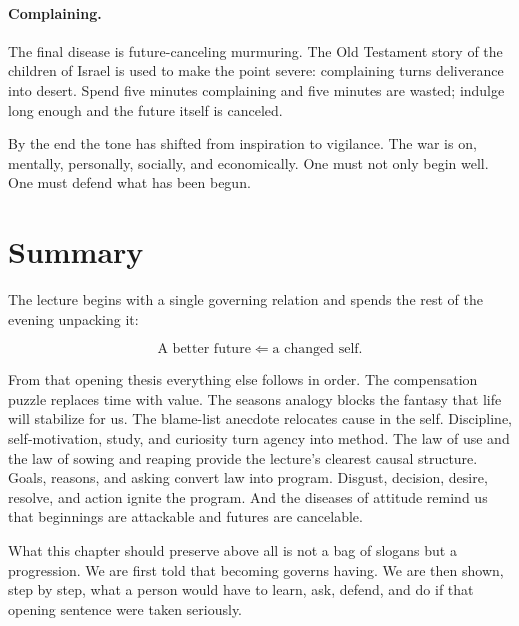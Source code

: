 \paragraph{Complaining.} The final disease is future-canceling murmuring. The Old Testament story of the children of Israel is used to make the point severe: complaining turns deliverance into desert. Spend five minutes complaining and five minutes are wasted; indulge long enough and the future itself is canceled.

By the end the tone has shifted from inspiration to vigilance. The war is on, mentally, personally, socially, and economically. One must not only begin well. One must defend what has been begun.

\section{Summary}

The lecture begins with a single governing relation and spends the rest of the evening unpacking it:

\begin{equation}
\text{A better future} \Longleftarrow \text{a changed self}.
\end{equation}

From that opening thesis everything else follows in order. The compensation puzzle replaces time with value. The seasons analogy blocks the fantasy that life will stabilize for us. The blame-list anecdote relocates cause in the self. Discipline, self-motivation, study, and curiosity turn agency into method. The law of use and the law of sowing and reaping provide the lecture's clearest causal structure. Goals, reasons, and asking convert law into program. Disgust, decision, desire, resolve, and action ignite the program. And the diseases of attitude remind us that beginnings are attackable and futures are cancelable.

What this chapter should preserve above all is not a bag of slogans but a progression. We are first told that becoming governs having. We are then shown, step by step, what a person would have to learn, ask, defend, and do if that opening sentence were taken seriously.
